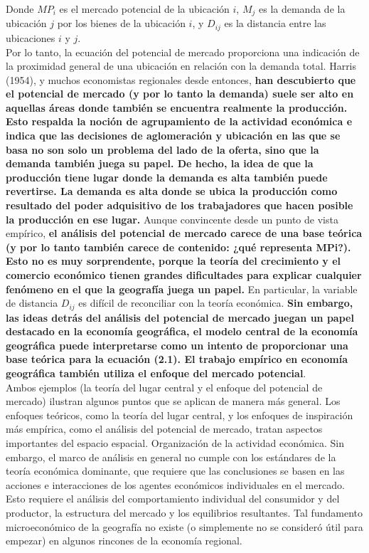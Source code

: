 Donde $MP_i$ es el mercado potencial de la ubicación $i$, $M_j$ es la demanda de la ubicación $j$ por los bienes de la ubicación $i$, y $D_{ij}$ es la distancia entre las ubicaciones $i$ y $j$.\\
Por lo tanto, la ecuación del potencial de mercado proporciona una indicación de la proximidad general de una ubicación en relación con la demanda total. Harris (1954), y muchos economistas regionales desde entonces, \textbf{han descubierto que el potencial de mercado (y por lo tanto la demanda) suele ser alto en aquellas áreas donde también se encuentra realmente la producción. Esto respalda la noción de agrupamiento de la actividad económica e indica que las decisiones de aglomeración y ubicación en las que se basa no son solo un problema del lado de la oferta, sino que la demanda también juega su papel. De hecho, la idea de que la producción tiene lugar donde la demanda es alta también puede revertirse. La demanda es alta donde se ubica la producción como resultado del poder adquisitivo de los trabajadores que hacen posible la producción en ese lugar.} Aunque convincente desde un punto de vista empírico, \textbf{el análisis del potencial de mercado carece de una base teórica (y por lo tanto también carece de contenido: ¿qué representa MPi?). Esto no es muy sorprendente, porque la teoría del crecimiento y el comercio económico tienen grandes dificultades para explicar cualquier fenómeno en el que la geografía juega un papel.} En particular, la variable de distancia $D_{ij}$ es difícil de reconciliar con la teoría económica. \textbf{Sin embargo, las ideas detrás del análisis del potencial de mercado juegan un papel destacado en la economía geográfica, el modelo central de la economía geográfica puede interpretarse como un intento de proporcionar una base teórica para la ecuación (2.1). El trabajo empírico en economía geográfica también utiliza el enfoque del mercado potencial}.\\
Ambos ejemplos (la teoría del lugar central y el enfoque del potencial de mercado) ilustran algunos puntos que se aplican de manera más general. Los enfoques teóricos, como la teoría del lugar central, y los enfoques de inspiración más empírica, como el análisis del potencial de mercado, tratan aspectos importantes del espacio espacial. Organización de la actividad económica. Sin embargo, el marco de análisis en general no cumple con los estándares de la teoría económica dominante, que requiere que las conclusiones se basen en las acciones e interacciones de los agentes económicos individuales en el mercado. Esto requiere el análisis del comportamiento individual del consumidor y del productor, la estructura del mercado y los equilibrios resultantes. Tal fundamento microeconómico de la geografía no existe (o simplemente no se consideró útil para empezar) en algunos rincones de la economía regional.  

